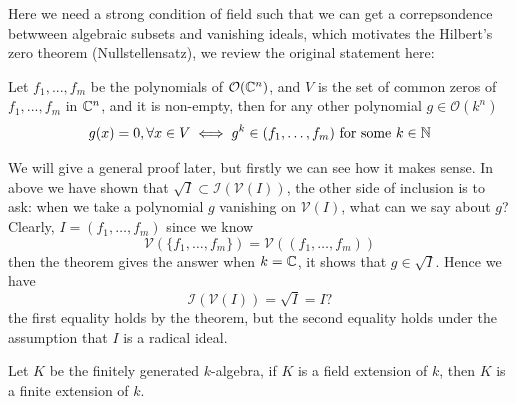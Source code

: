 Here we need a strong condition of field such that we can get a correpsondence betwween algebraic subsets and vanishing ideals, which motivates the Hilbert's zero theorem (Nullstellensatz), we review the original statement here:
\begin{theorem}[1893] \label{orginal-Nullstellensatz}
    Let \(f_1,...,f_m\) be the polynomials of \(\mathcal{O}(\mathbb{C}^n)\), and \(V\) is the set of common zeros of \(f_1,...,f_m\) in \(\mathbb{C}^n\), and it is non-empty, then for any other polynomial \(g \in \mathcal{O}(k^n)\)
    \[g(x) = 0, \forall x \in V \iff g^k \in (f_1,\dots,f_m) \text{ for some } k \in \mathbb{N}\]
\end{theorem}
We will give a general proof later, but firstly we can see how it makes sense. In above we have shown that \(\sqrt{I} \subset \mathcal{I}(\mathcal{V}(I))\), the other side of inclusion is to ask: when we take a polynomial \(g\) vanishing on \(\mathcal{V}(I)\), what can we say about \(g\)? Clearly, \(I = (f_1,\dots,f_m)\) since we know 
\[\mathcal{V}(\{f_1,\dots,f_m\}) = \mathcal{V}((f_1,\dots,f_m))\]
then the theorem gives the answer when \(k = \mathbb{C}\), it shows that \(g \in \sqrt{I}\). Hence we have
\[\mathcal{I}(\mathcal{V}(I)) = \sqrt{I} = I ?\]
the first equality holds by the theorem, but the second equality holds under the assumption that \(I\) is a radical ideal.

\begin{colortheorem}
    Let \(K\) be the finitely generated \(k\)-algebra, if \(K\) is a field extension of \(k\), then \(K\) is a finite extension of \(k\).
 \end{colortheorem}

